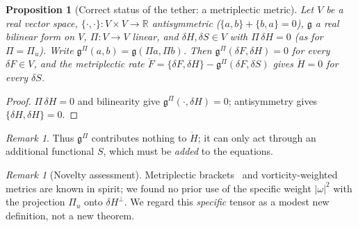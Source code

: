\documentclass[11pt]{amsart}
\newtheorem{proposition}[theorem]{Proposition}
\theoremstyle{definition}\newtheorem{definition}[theorem]{Definition}
\theoremstyle{remark}\newtheorem{remark}[theorem]{Remark}
\begin{document}
\begin{proposition}[Correct status of the tether: a metriplectic metric]\label{prop:status}
Let $V$ be a real vector space, $\{\cdot,\cdot\}\colon V\times V\to\mathbb R$ antisymmetric ($\{a,b\}+\{b,a\}=0$),
$\mathfrak g$ a real bilinear form on $V$, $\Pi\colon V\to V$ linear, and $\delta H,\delta S\in V$ with $\Pi\,\delta H=0$
(as for $\Pi=\Pi_u$). Write $\mathfrak g^\Pi(a,b)=\mathfrak g(\Pi a,\Pi b)$. Then $\mathfrak g^\Pi(\delta F,\delta H)=0$ for every $\delta F\in V$,
and the metriplectic rate $\dot F=\{\delta F,\delta H\}-\mathfrak g^\Pi(\delta F,\delta S)$ gives $\dot H=0$ for every $\delta S$.
\end{proposition}
\begin{proof}$\Pi\,\delta H=0$ and bilinearity give $\mathfrak g^\Pi(\cdot,\delta H)=0$; antisymmetry gives $\{\delta H,\delta H\}=0$.\end{proof}
\begin{remark}Thus $\mathfrak g^\Pi$ contributes nothing to $\dot H$; it can only act through an additional functional $S$, which must be \emph{added} to the equations.\end{remark}
\begin{remark}[Novelty assessment]
Metriplectic brackets~\cite{Morrison1986,Grmela} and vorticity-weighted metrics are known in spirit; we found no prior use of the specific weight $|\omega|^2$ with the projection $\Pi_u$ onto $\delta H^\perp$. We regard this \emph{specific} tensor as a modest new definition, not a new theorem.
\end{remark}
\end{document}
